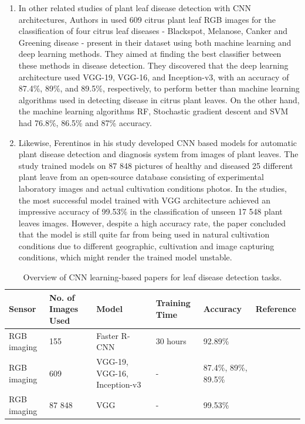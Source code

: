 \begin{enumerate}
\item In other related studies of plant leaf disease detection with CNN architectures, Authors in \cite{sujatha2021performance} used 609 citrus plant leaf RGB images for the classification of four citrus leaf diseases - Blackspot, Melanose, Canker and Greening disease - present in their dataset using both machine learning and deep learning methods. They aimed at finding the best classifier between these methods in disease detection. They discovered that the deep learning architecture used  VGG-19, VGG-16, and Inception-v3, with an accuracy of 87.4\%, 89\%, and 89.5\%, respectively, to perform better than machine learning algorithms used in detecting disease in citrus plant leaves. On the other hand, the machine learning algorithms  RF, Stochastic gradient descent and SVM had 76.8\%, 86.5\% and 87\% accuracy.

\item Likewise, Ferentinos \cite{ferentinos2018deep} in his study developed CNN based models for automatic plant disease detection and diagnosis system from images of plant leaves. The study trained models on 87 848 pictures of healthy and diseased 25 different plant leave from an open-source database consisting of experimental laboratory images and actual cultivation conditions photos. In the studies, the most successful model trained with VGG architecture achieved an impressive accuracy of 99.53\% in the classification of unseen 17 548 plant leaves images. However, despite a high accuracy rate, the paper concluded that the model is still quite far from being used in natural cultivation conditions due to different geographic, cultivation and image capturing conditions, which might render the trained model unstable.
\end{enumerate}

\begin{table}[h!]
\centering 
 \begin{tabular}{p{2cm}|p{2cm}|p{2cm}|p{2cm}|p{2cm}|p{2cm}} 
 \hline
  Sensor & No. of Images Used  & Model & Training Time & Accuracy & Reference\\ [0.5ex] 
 \hline\hline
 RGB imaging & 155 & Faster R-CNN & 30 hours & 92.89\% & \cite{ozguven2019automatic} \\ 
 \hline
 RGB imaging & 609 & VGG-19, VGG-16, Inception-v3 & - & 87.4\%, 89\%, 89.5\% & \cite{sujatha2021performance} \\ 
 \hline
  RGB imaging & 87 848 & VGG & - & 99.53\% & \cite{ferentinos2018deep} \\ 
 \hline
 \end{tabular}
 \caption{Overview of CNN learning-based papers for leaf disease detection tasks.}
 \label{table:2}
\end{table}

